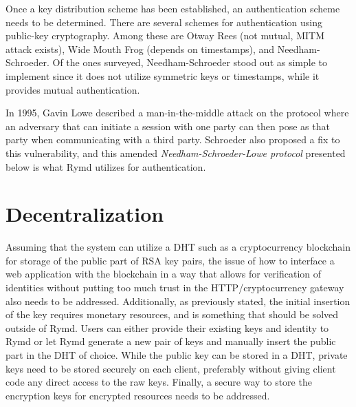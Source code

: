 Once a key distribution scheme has been established, an authentication scheme needs to be determined. There are several schemes for authentication using public-key cryptography. Among these are Otway Rees (not mutual, MITM attack exists), Wide Mouth Frog (depends on timestamps), and Needham-Schroeder. Of the ones surveyed, Needham-Schroeder stood out as simple to implement since it does not utilize symmetric keys or timestamps, while it provides mutual authentication.

In 1995, Gavin Lowe described a man-in-the-middle attack on the protocol where an adversary that can initiate a session with one party can then pose as that party when communicating with a third party. Schroeder also proposed a fix to this vulnerability, and this amended \emph{Needham-Schroeder-Lowe protocol} presented below is what Rymd utilizes for authentication.


\section{Decentralization}
Assuming that the system can utilize a DHT such as a cryptocurrency blockchain for storage of the public part of RSA key pairs, the issue of how to interface a web application with the blockchain in a way that allows for verification of identities without putting too much trust in the HTTP/cryptocurrency gateway also needs to be addressed. Additionally, as previously stated, the initial insertion of the key requires monetary resources, and is something that should be solved outside of Rymd. Users can either provide their existing keys and identity to Rymd or let Rymd generate a new pair of keys and manually insert the public part in the DHT of choice.
While the public key can be stored in a DHT, private keys need to be stored securely on each client, preferably without giving client code any direct access to the raw keys. Finally, a secure way to store the encryption keys for encrypted resources needs to be addressed. 




